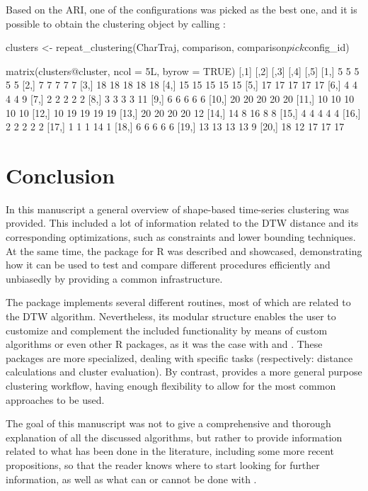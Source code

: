 Based on the ARI,
one of the configurations was picked as the best one,
and it is possible to obtain the clustering object by calling :

\begin{example}
clusters <- repeat_clustering(CharTraj, comparison, comparison$pick$config_id)

matrix(clusters@cluster, ncol = 5L, byrow = TRUE)
      [,1] [,2] [,3] [,4] [,5]
 [1,]    5    5    5    5    5
 [2,]    7    7    7    7    7
 [3,]   18   18   18   18   18
 [4,]   15   15   15   15   15
 [5,]   17   17   17   17   17
 [6,]    4    4    4    4    9
 [7,]    2    2    2    2    2
 [8,]    3    3    3    3   11
 [9,]    6    6    6    6    6
[10,]   20   20   20   20   20
[11,]   10   10   10   10   10
[12,]   10   19   19   19   19
[13,]   20   20   20   20   12
[14,]   14    8   16    8    8
[15,]    4    4    4    4    4
[16,]    2    2    2    2    2
[17,]    1    1    1   14    1
[18,]    6    6    6    6    6
[19,]   13   13   13   13    9
[20,]   18   12   17   17   17
\end{example}

\section{Conclusion}
\label{sec:conclusion}

In this manuscript a general overview of shape-based time-series clustering was provided.
This included a lot of information related to the DTW distance and its corresponding optimizations,
such as constraints and lower bounding techniques.
At the same time, the \dtwclust{} package for R was described and showcased,
demonstrating how it can be used to test and compare different procedures efficiently and unbiasedly by providing a common infrastructure.

The package implements several different routines,
most of which are related to the DTW algorithm.
Nevertheless, its modular structure enables the user to customize and complement the included functionality by means of custom algorithms or even other R packages,
as it was the case with  and .
These packages are more specialized, dealing with specific tasks
(respectively: distance calculations and cluster evaluation).
By contrast, \dtwclust{} provides a more general purpose clustering workflow,
having enough flexibility to allow for the most common approaches to be used.

The goal of this manuscript was not to give a comprehensive and thorough explanation of all the discussed algorithms,
but rather to provide information related to what has been done in the literature,
including some more recent propositions,
so that the reader knows where to start looking for further information,
as well as what can or cannot be done with \dtwclust{}.

